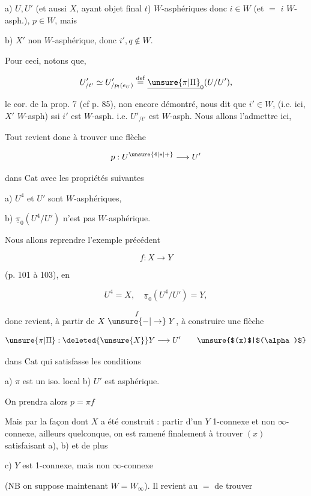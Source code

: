 a) $U,U'$ (et aussi $X$, ayant objet final $t$) $W$-asphériques donc  $i\in W$ (et $=$ $i$ $W$-asph.), $p\in W$, mais

b) $X'$ non $W$-asphérique, donc $i',q\notin W$.

Pour ceci, notons que,

\[
U'_{/t'}\simeq U'_{/p_!(e_U)}\overset{\mathrm{def}}{=}\underline{\unsure{\pi|\Pi}}_0(U/U'),
\]

le cor. de la prop. 7 (cf p. 85), non encore démontré, nous dit que $i'\in W$,  (i.e. ici, $X'$\unsure{,} $W$-asph) ssi $i'$ est $W$-asph. i.e. $U'_{/t'}$ est $W$-asph. Nous allons l'admettre ici,

Tout revient donc à trouver une flèche

\[
p:U^{\unsure{4|*|+}}\longrightarrow U'
\]

dans $\mathrm{Cat}$ avec les propriétés suivantes

a) $U^4$ et $U'$ sont $W$-asphériques,

b) $\underline{\pi}_0(U^4/U')$ n'est pas $W$-asphérique.

Nous allons reprendre l'exemple précédent

\[
f:X\longrightarrow Y
\]

(p. 101 à 103), en 

\[
U^4=X,\quad\underline{\pi}_0(U^4/U')=Y,
\]

donc  revient, à partir de  $X\mathrel{\overset{f}{\unsure{-|\to}}}Y$, à construire une flèche

\[
\unsure{\pi|\Pi}:\deleted{\unsure{X}}Y\longrightarrow U'\tag*{\unsure{$(x)$|$(\alpha)$}}
\]

dans $\mathrm{Cat}$ qui satisfasse les conditions

a) $\pi$ est un iso. local \qquad b) $U'$ est asphérique.

On prendra alors $p=\pi f$

Mais par la façon dont $X$ a été construit : partir d'un $Y$ 1-connexe et non $\infty$-connexe,   ailleurs quelconque, on est ramené finalement à trouver $(x)$ satisfaisant a), b) et de plus

c) $Y$ est 1-connexe, mais non $\infty$-connexe

(NB on suppose maintenant $W=W_\infty$). Il revient au $=$ de trouver

